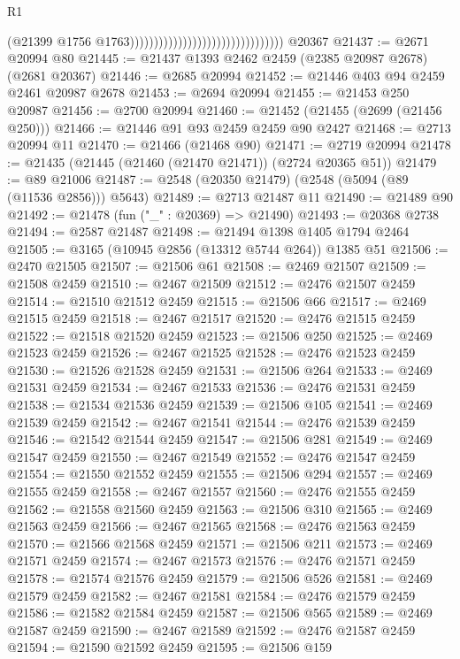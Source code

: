 \begin{lexlean}{R1}
\begin{coremodule}
                                                                  (@21399
                                                                    @1756
                                                                    @1763))))))))))))))))))))))))))))))))
    @20367
@21437 := @2671 @20994 @80
@21445 := @21437 @1393 @2462 @2459 (@2385 @20987 @2678) (@2681 @20367)
@21446 := @2685 @20994
@21452 := @21446 @403 @94 @2459 @2461 @20987 @2678
@21453 := @2694 @20994
@21455 := @21453 @250 @20987
@21456 := @2700 @20994
@21460 := @21452 (@21455 (@2699 (@21456 @250)))
@21466 := @21446 @91 @93 @2459 @2459 @90 @2427
@21468 := @2713 @20994 @11
@21470 := @21466 (@21468 @90)
@21471 := @2719 @20994
@21478 := @21435 (@21445 (@21460 (@21470 @21471)) (@2724 @20365 @51))
@21479 := @89 @21006
@21487 := @2548 (@20350 @21479) (@2548 (@5094 (@89 (@11536 @2856))) @5643)
@21489 := @2713 @21487 @11
@21490 := @21489 @90
@21492 := @21478 (fun ("_" : @20369) => @21490)
@21493 := @20368 @2738
@21494 := @2587 @21487
@21498 := @21494 @1398 @1405 @1794 @2464
@21505 := @3165 (@10945 @2856 (@13312 @5744 @264)) @1385 @51
@21506 := @2470 @21505
@21507 := @21506 @61
@21508 := @2469 @21507
@21509 := @21508 @2459
@21510 := @2467 @21509
@21512 := @2476 @21507 @2459
@21514 := @21510 @21512 @2459
@21515 := @21506 @66
@21517 := @2469 @21515 @2459
@21518 := @2467 @21517
@21520 := @2476 @21515 @2459
@21522 := @21518 @21520 @2459
@21523 := @21506 @250
@21525 := @2469 @21523 @2459
@21526 := @2467 @21525
@21528 := @2476 @21523 @2459
@21530 := @21526 @21528 @2459
@21531 := @21506 @264
@21533 := @2469 @21531 @2459
@21534 := @2467 @21533
@21536 := @2476 @21531 @2459
@21538 := @21534 @21536 @2459
@21539 := @21506 @105
@21541 := @2469 @21539 @2459
@21542 := @2467 @21541
@21544 := @2476 @21539 @2459
@21546 := @21542 @21544 @2459
@21547 := @21506 @281
@21549 := @2469 @21547 @2459
@21550 := @2467 @21549
@21552 := @2476 @21547 @2459
@21554 := @21550 @21552 @2459
@21555 := @21506 @294
@21557 := @2469 @21555 @2459
@21558 := @2467 @21557
@21560 := @2476 @21555 @2459
@21562 := @21558 @21560 @2459
@21563 := @21506 @310
@21565 := @2469 @21563 @2459
@21566 := @2467 @21565
@21568 := @2476 @21563 @2459
@21570 := @21566 @21568 @2459
@21571 := @21506 @211
@21573 := @2469 @21571 @2459
@21574 := @2467 @21573
@21576 := @2476 @21571 @2459
@21578 := @21574 @21576 @2459
@21579 := @21506 @526
@21581 := @2469 @21579 @2459
@21582 := @2467 @21581
@21584 := @2476 @21579 @2459
@21586 := @21582 @21584 @2459
@21587 := @21506 @565
@21589 := @2469 @21587 @2459
@21590 := @2467 @21589
@21592 := @2476 @21587 @2459
@21594 := @21590 @21592 @2459
@21595 := @21506 @159

\end{coremodule}
\end{lexlean}
